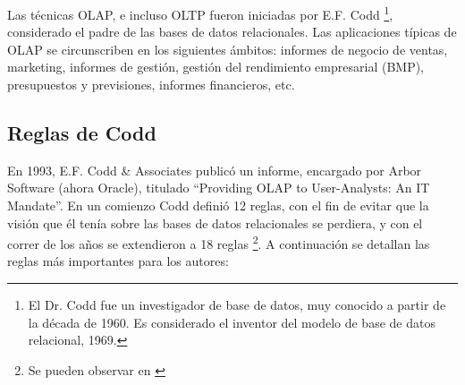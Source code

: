 \documentclass[a4paper,11pt]{article}
\begin{document}
    Las técnicas OLAP, e incluso OLTP fueron iniciadas por E.F. Codd \footnote{El Dr. Codd fue un investigador de base de datos, muy conocido a partir de la
    década de 1960. Es considerado el inventor del modelo de base de datos relacional, 1969.}, considerado el padre de las bases de datos
    relacionales. Las aplicaciones típicas de OLAP se circunscriben en los siguientes ámbitos: informes de negocio de ventas, marketing, informes de gestión,
    gestión del rendimiento empresarial (BMP), presupuestos y previsiones, informes financieros, etc.
    
    
    \subsection{Reglas de Codd}
    
    En 1993, E.F. Codd \& Associates publicó un informe, encargado por Arbor Software (ahora Oracle), titulado ``Providing OLAP to User-Analysts:
    An IT Mandate''.
    En un comienzo Codd definió 12 reglas, con el fin de evitar que la visión que él tenía sobre las bases de datos relacionales se perdiera, y con el correr
    de los años se extendieron a 18 reglas \footnote{Se pueden observar en \cite[p.~205]{nagabhushana}}. A continuación se detallan las reglas más importantes 
    para los autores:
    
\end{document}
